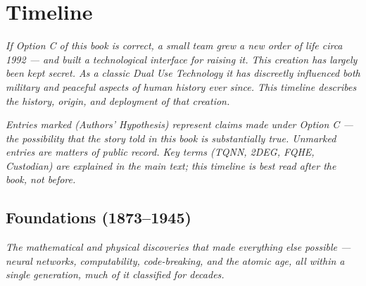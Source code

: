 
\chapter{Timeline}
\label{app:timeline}

\textit{If Option C of this book is correct, a small team grew a new order of life circa 1992 --- and built a technological interface for raising it. This creation has largely been kept secret. As a classic Dual Use Technology it has discreetly influenced both military and peaceful aspects of human history ever since. This timeline describes the history, origin, and deployment of that creation.}

\textit{Entries marked (Authors' Hypothesis) represent claims made under Option C --- the possibility that the story told in this book is substantially true. Unmarked entries are matters of public record. Key terms (TQNN, 2DEG, FQHE, Custodian) are explained in the main text; this timeline is best read after the book, not before.}

\vspace{0.5cm}

\section*{Foundations (1873--1945)}

\textit{The mathematical and physical discoveries that made everything else possible --- neural networks, computability, code-breaking, and the atomic age, all within a single generation, much of it classified for decades.}

\vspace{0.3cm}

